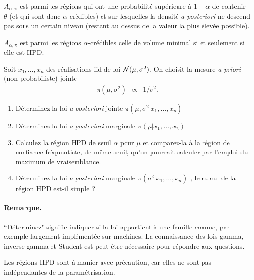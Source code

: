 $A_{\alpha,\pi}$ est parmi les régions qui ont une probabilité supérieure à $1-{\alpha}$ de contenir $\theta$ (et qui sont donc $\alpha$-crédibles) et sur lesquelles la densité {\it a posteriori} ne descend pas sous un certain niveau (restant au dessus de la valeur la plus élevée possible). \\

\begin{theorem}
$A_{\alpha,\pi}$ est parmi les régions $\alpha$-crédibles celle de volume minimal si et seulement si elle est HPD.
\end{theorem}



\begin{exec}
Soit $x_1,\ldots,x_n$ des réalisations iid de loi ${\cal{N}}(\mu,\sigma^2)$. On choisit la mesure {\it a priori} (non probabiliste) jointe
\begin{eqnarray*}
\pi(\mu,\sigma^2) & \propto & 1/\sigma^2.
\end{eqnarray*}
\begin{enumerate}
\item Déterminez la loi {\it a posteriori} jointe $\pi(\mu,\sigma^2|x_1,\ldots,x_n)$ 
\item Déterminez la loi {\it a posteriori} marginale $\pi(\mu|x_1,\ldots,x_n)$ 
\item Calculez la région HPD de seuil $\alpha$ pour $\mu$ et comparez-la à la région de confiance fréquentiste, de même seuil, qu'on pourrait calculer par l'emploi du maximum de vraisemblance.
\item Déterminez la loi {\it a posteriori} marginale $\pi(\sigma^2|x_1,\ldots,x_n)$ ; le calcul de la région HPD est-il simple ?
\end{enumerate}
\paragraph{Remarque.} ``Déterminez" signifie indiquer si la loi appartient à une famille connue, par exemple largement implémentée sur machines. La connaissance des lois gamma, inverse gamma et Student est peut-être nécessaire pour répondre aux questions.
\end{exec}

\if{} 
\fi

Les régions HPD sont à manier avec précaution, car elles  ne sont pas indépendantes de la paramétrisation. \\

